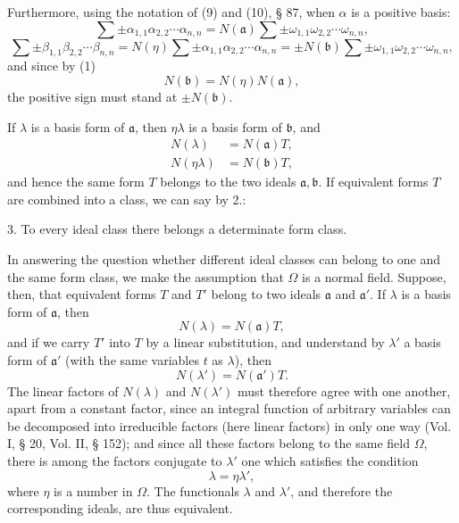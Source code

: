 \documentclass[11pt]{article}
\begin{document}
Furthermore, using the notation of (9) and (10), § 87, when $\alpha$ is a positive basis:
\[
 \sum\pm \alpha_{1,1}\alpha_{2,2}\cdots\alpha_{n,n}=N(\mathfrak a)\sum\pm \omega_{1,1}\omega_{2,2}\cdots\omega_{n,n},
\]
\[
 \sum\pm \beta_{1,1}\beta_{2,2}\cdots\beta_{n,n}=N(\eta)
 \sum\pm \alpha_{1,1}\alpha_{2,2}\cdots\alpha_{n,n}
 =\pm N(\mathfrak b)
 \sum\pm \omega_{1,1}\omega_{2,2}\cdots\omega_{n,n},
\]
and since by (1)
\begin{equation}
 N(\mathfrak b)=N(\eta)N(\mathfrak a),\tag{5}
\end{equation}
the positive sign must stand at $\pm N(\mathfrak b)$.

If $\lambda$ is a basis form of $\mathfrak a$, then $\eta\lambda$ is a basis form of $\mathfrak b$, and
\begin{equation}
 \begin{aligned}
 N(\lambda)&=N(\mathfrak a)T,\\
 N(\eta\lambda)&=N(\mathfrak b)T,
 \end{aligned}\tag{6}
\end{equation}
and hence the same form $T$ belongs to the two ideals $\mathfrak a,\mathfrak b$. If equivalent forms $T$ are combined into a class, we can say by 2.:

3. To every ideal class there belongs a determinate form class.

In answering the question whether different ideal classes can belong to one and the same form class, we make the assumption that $\Omega$ is a normal field. Suppose, then, that equivalent forms $T$ and $T'$ belong to two ideals $\mathfrak a$ and $\mathfrak a'$. If $\lambda$ is a basis form of $\mathfrak a$, then
\begin{equation}
 N(\lambda)=N(\mathfrak a)T,\tag{7}
\end{equation}
and if we carry $T'$ into $T$ by a linear substitution, and understand by $\lambda'$ a basis form of $\mathfrak a'$ (with the same variables $t$ as $\lambda$), then
\begin{equation}
 N(\lambda')=N(\mathfrak a')T.\tag{8}
\end{equation}
The linear factors of $N(\lambda)$ and $N(\lambda')$ must therefore agree with one another, apart from a constant factor, since an integral function of arbitrary variables can be decomposed into irreducible factors (here linear factors) in only one way (Vol. I, § 20, Vol. II, § 152); and since all these factors belong to the same field $\Omega$, there is among the factors conjugate to $\lambda'$ one which satisfies the condition
\[
 \lambda=\eta\lambda',
\]
where $\eta$ is a number in $\Omega$. The functionals $\lambda$ and $\lambda'$, and therefore the corresponding ideals, are thus equivalent.
\end{document}
